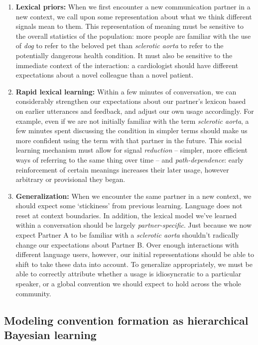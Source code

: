 \documentclass[11pt, floatsintext, jou]{apa6}
\begin{document}
\begin{enumerate}
\item \textbf{Lexical priors:} When we first encounter a new communication partner in a new context, we call upon some representation about what we think different signals mean to them. This representation of meaning must be sensitive to the overall statistics of the population: more people are familiar with the use of \emph{dog} to refer to the beloved pet than \emph{sclerotic aorta} to refer to the potentially dangerous health condition. It must also be sensitive to the immediate context of the interaction: a cardiologist should have different expectations about a novel colleague than a novel patient.
\item \textbf{Rapid lexical learning:} Within a few minutes of conversation, we can considerably strengthen our expectations about our partner's lexicon based on earlier utterances and feedback, and adjust our own usage accordingly. For example, even if we are not initially familiar with the term \emph{sclerotic aorta}, a few minutes spent discussing the condition in simpler terms should make us more confident using the term with that partner in the future. This social learning mechanism must allow for signal \emph{reduction} -- simpler, more efficient ways of referring to the same thing over time -- and \emph{path-dependence}: early reinforcement of certain meanings increases their later usage, however arbitrary or provisional they began. 
\item \textbf{Generalization:} When we encounter the same partner in a new context, we should expect some `stickiness' from previous learning. Language does not reset at context boundaries. In addition, the lexical model we've learned within a conversation should be largely \emph{partner-specific}. Just because we now expect Partner A to be familiar with a \emph{sclerotic aorta} shouldn't radically change our expectations about Partner B. Over enough interactions with different language users, however, our initial representations should be able to shift to take these data into account. To generalize appropriately, we must be able to correctly attribute whether a usage is idiosyncratic to a particular speaker, or a global convention we should expect to hold across the whole community.

\end{enumerate}

\subsection{Modeling convention formation as hierarchical Bayesian learning}
\end{document}
